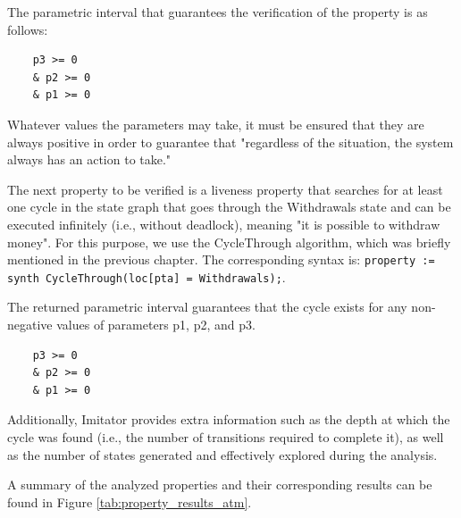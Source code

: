 The parametric interval that guarantees the verification of the property is as follows:

\begin{verbatim}
    p3 >= 0
    & p2 >= 0
    & p1 >= 0
\end{verbatim}

Whatever values the parameters may take, it must be ensured that they are always positive in order to guarantee that "regardless of the situation, the system always has an action to take."

The next property to be verified is a liveness property that searches for at least one cycle in the state graph that goes through the Withdrawals state and can be executed infinitely (i.e., without deadlock), meaning "it is possible to withdraw money". For this purpose, we use the CycleThrough algorithm, which was briefly mentioned in the previous chapter. The corresponding syntax is: \texttt{property := synth CycleThrough(loc[pta] = Withdrawals);}.

The returned parametric interval guarantees that the cycle exists for any non-negative values of parameters p1, p2, and p3.

\begin{verbatim}
    p3 >= 0
    & p2 >= 0
    & p1 >= 0
\end{verbatim}

Additionally, Imitator provides extra information such as the depth at which the cycle was found (i.e., the number of transitions required to complete it), as well as the number of states generated and effectively explored during the analysis.

A summary of the analyzed properties and their corresponding results can be found in Figure \ref{tab:property_results_atm}.

